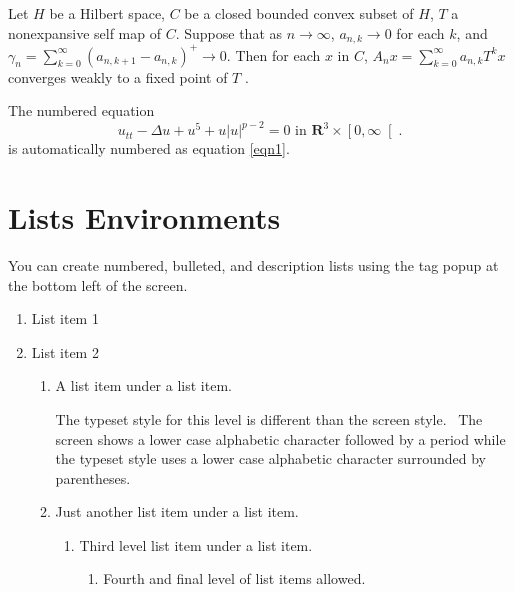 \documentclass[11pt,spanish]{report}
\begin{document}
Let $H$ be a Hilbert space, $C$ be a closed bounded convex subset of $H$, $T$
a nonexpansive self map of $C$. Suppose that as $n\rightarrow\infty$,
$a_{n,k}\rightarrow0$ for each $k$, and $\gamma_{n}=\sum_{k=0}^{\infty}\left(
a_{n,k+1}-a_{n,k}\right)  ^{+}\rightarrow0.$ Then for each $x$ in $C$,
$A_{n}x=\sum_{k=0}^{\infty}a_{n,k}T^{k}x$ converges weakly to a fixed point of
$T$ .

The numbered equation
\begin{equation}
u_{tt}-\Delta u+u^{5}+u\left|  u\right|  ^{p-2}=0\text{ in }\mathbf{R}
^{3}\times\left[  0,\infty\right[  .\label{eqn1}
\end{equation}
is automatically numbered as equation \ref{eqn1}.

\section{Lists Environments}

You can create numbered, bulleted, and description lists using the tag popup
at the bottom left of the screen.

\begin{enumerate}
\item List item 1

\item List item 2

\begin{enumerate}
\item A list item under a list item.

The typeset style for this level is different than the screen style. \ The
screen shows a lower case alphabetic character followed by a period while the
typeset style uses a lower case alphabetic character surrounded by parentheses.

\item Just another list item under a list item.

\begin{enumerate}
\item Third level list item under a list item.

\begin{enumerate}
\item Fourth and final level of list items allowed.
\end{enumerate}
\end{enumerate}
\end{enumerate}
\end{enumerate}
\end{document}
